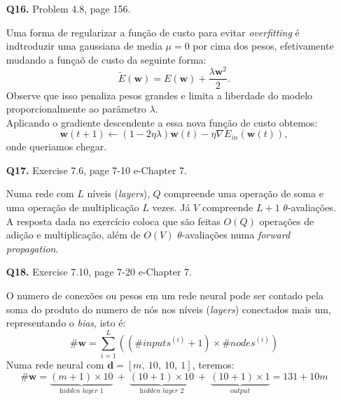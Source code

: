 \documentclass[12pt]{article}
\begin{document}
\begin{enumerate}
\begin{addmargin}[1em]{2em}
\begin{align*}
			E_{in}(\mathbf{w}) & = \frac{((\mathbf{w - w_{lin}})^TZ^TZ(\mathbf{w - w_{lin}}) - 2 \mathbf{w}^TZ^Ty + y^T(I - H)y)}{N}
		\end{align*}
		\begin{itemize}
			\item[a)] Queremos $\nabla E_{in}(\mathbf{w}) = 0$, então, da expressão acima o valor de \textbf{w} que minimiza $E_{in}$ é $\mathbf{w_{lin}}$.
			\item[b)] O menor $E_{in}$ ocorre quando $\mathbf{w_{lin}} = (Z^TZ)^{-1}Z^Ty$.
		\end{itemize}
	\end{addmargin}
\item [\textbf{Q16.}] Problem 4.8, page 156.
	\begin{addmargin}[1em]{2em}
		Uma forma de regularizar a função de custo para evitar \textit{overfitting} é indtroduzir uma gaussiana de media $\mu = 0$ por cima dos pesos, efetivamente mudando a funçaõ de custo da seguinte forma: \[\tilde{E}(\mathbf{w}) = E(\mathbf{w}) + \frac{\lambda \mathbf{w}^2}{2}.\]
		Observe que isso penaliza pesos grandes e limita a liberdade do modelo proporcionalmente ao parâmetro $\lambda$.\\
		Aplicando o gradiente descendente a essa nova função de custo obtemos: \[\mathbf{w}(t+1) \leftarrow (1-2\eta \lambda)\mathbf{w}(t) - \eta \nabla E_{in}(\mathbf{w}(t)),\]
		onde queriamos chegar.
	\end{addmargin}
\item [\textbf{Q17.}] Exercise 7.6, page 7-10 e-Chapter 7.
	\begin{addmargin}[1em]{2em}
		Numa rede com $L$ níveis (\textit{layers}), $Q$ compreende uma operação de soma e uma operação de multiplicação $L$ vezes. Já $V$ compreende $L+1$ $\theta$-avaliações.\\
		A resposta dada no exercício coloca que são feitas $O(Q)$ operações de adição e multiplicação, além de $O(V)$ $\theta$-avaliações numa \textit{forward propagation}.
	\end{addmargin}
\item [\textbf{Q18.}] Exercise 7.10, page 7-20 e-Chapter 7.
	\begin{addmargin}[1em]{2em}
		O numero de conexões ou pesos em um rede neural pode ser contado pela soma do produto do numero de nós nos níveis (\textit{layers}) conectados mais um, representando o \textit{bias}, isto é: \[\#\mathbf{w}= \sum_{i=1}^{L} \left( (\#inputs^{(i)} + 1) \times \#nodes^{(i)} \right) \] 
		Numa rede neural com $\mathbf{d} = [m,\ 10,\ 10,\ 1]$, teremos: \[\#\mathbf{w} = \underbrace{(m + 1) \times 10}_\textit{hidden layer 1}\ +\ \underbrace{(10 + 1) \times 10}_\textit{hidden layer 2}\ +\ \underbrace{(10 + 1) \times 1}_\textit{output} = 131 + 10m\]
	\end{addmargin}	


\end{enumerate}
\end{document}
